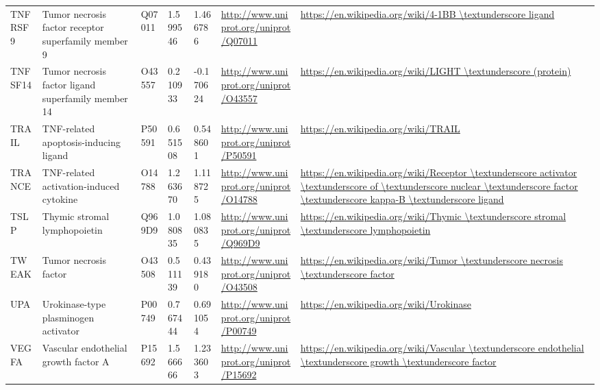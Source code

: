 \begin{table}[H]
\begin{tabular}{ lllllll }
        \multicolumn{1}{l|}{ TNFRSF9 } &  Tumor necrosis factor receptor superfamily member 9   & Q07011   & 1.599546   & 1.466786   & \url{http://www.uniprot.org/uniprot/Q07011}   & \url{https://en.wikipedia.org/wiki/4-1BB \textunderscore ligand}          \\ 
        \multicolumn{1}{l|}{ TNFSF14 } &  Tumor necrosis factor ligand superfamily member 14   & O43557   & 0.210933   & -0.170624   & \url{http://www.uniprot.org/uniprot/O43557}   & \url{https://en.wikipedia.org/wiki/LIGHT \textunderscore (protein)}          \\ 
        \multicolumn{1}{l|}{ TRAIL } &  TNF-related apoptosis-inducing ligand   & P50591   & 0.651508   & 0.548601   & \url{http://www.uniprot.org/uniprot/P50591}   & \url{https://en.wikipedia.org/wiki/TRAIL}          \\ 
        \multicolumn{1}{l|}{ TRANCE } &  TNF-related activation-induced cytokine   & O14788   & 1.263670   & 1.118725   & \url{http://www.uniprot.org/uniprot/O14788}   & \url{https://en.wikipedia.org/wiki/Receptor \textunderscore activator \textunderscore of \textunderscore nuclear \textunderscore factor \textunderscore kappa-B \textunderscore ligand}          \\ 
        \multicolumn{1}{l|}{ TSLP } &  Thymic stromal lymphopoietin   & Q969D9   & 1.080835   & 1.080835   & \url{http://www.uniprot.org/uniprot/Q969D9}   & \url{https://en.wikipedia.org/wiki/Thymic \textunderscore stromal \textunderscore lymphopoietin}          \\ 
        \multicolumn{1}{l|}{ TWEAK } &  Tumor necrosis factor   & O43508   & 0.511139   & 0.439180   & \url{http://www.uniprot.org/uniprot/O43508}   & \url{https://en.wikipedia.org/wiki/Tumor \textunderscore necrosis \textunderscore factor}          \\ 
        \multicolumn{1}{l|}{ UPA } &  Urokinase-type plasminogen activator   & P00749   & 0.767444   & 0.691054   & \url{http://www.uniprot.org/uniprot/P00749}   & \url{https://en.wikipedia.org/wiki/Urokinase}          \\ 
        \multicolumn{1}{l|}{ VEGFA } &  Vascular endothelial growth factor A   & P15692   & 1.566666   & 1.233603   & \url{http://www.uniprot.org/uniprot/P15692}   & \url{https://en.wikipedia.org/wiki/Vascular \textunderscore endothelial \textunderscore growth \textunderscore factor}          \\ 

    \end{tabular}
 
\end{table}

